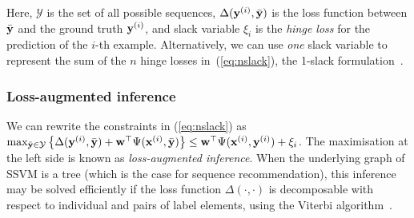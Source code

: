 Here,
$\mathcal{Y}$ is the set of all possible sequences,
$\Delta(\mathbf{y}^{({i})}, \bar{\mathbf{y}})$ is the loss function between $\bar{\mathbf{y}}$ and the ground truth $\mathbf{y}^{({i})}$,
and slack variable $\xi_i$ is the \emph{hinge loss} for the prediction of the $i$-th example. %
Alternatively, we can use \emph{one} slack variable to represent the sum of the $n$ hinge losses in~(\ref{eq:nslack}),
\ie the 1-slack formulation~\cite{joachims2009predicting}.


\subsubsection{Loss-augmented inference}
We can rewrite the constraints in (\ref{eq:nslack}) as
$\max_{\bar{\mathbf{y}} \in \mathcal{Y}} \left\{ \Delta(\mathbf{y}^{({i})}, \bar{\mathbf{y}}) + \mathbf{w}^\top \Psi(\mathbf{x}^{({i})}, \bar{\mathbf{y}}) \right\} \le
\mathbf{w}^\top \Psi(\mathbf{x}^{({i})}, \mathbf{y}^{({i})}) + \xi_i$.
The maximisation at the left side is known as \emph{loss-augmented inference}.
When the underlying graph of SSVM is a tree (which is the case for sequence recommendation),
this inference may be solved efficiently if the loss function $\Delta(\cdot,\cdot)$ is decomposable
with respect to individual and pairs of label elements,
\eg using the Viterbi algorithm~\cite{joachims2009predicting}.

